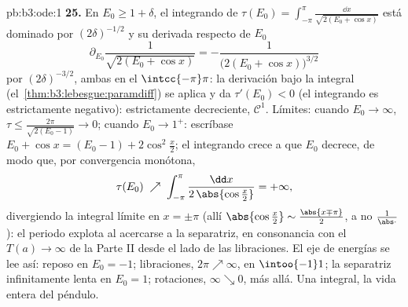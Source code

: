 \begin{solution}{pb:b3:ode:1}
\textbf{25.} En $E_0 \geq 1 + \delta$, el integrando de
$\tau(E_0) = \int_{-\pi}^{\pi}\frac{\dd x}{\sqrt{2(E_0 +
\cos x)}}$ está dominado por $(2\delta)^{-1/2}$ y su derivada respecto
de $E_0$
\[
\partial_{E_0}\frac1{\sqrt{2(E_0 + \cos x)}}
= -\frac{1}{\bigl(2(E_0 + \cos x)\bigr)^{3/2}}
\]
por $(2\delta)^{-3/2}$, ambas 
en el  $\intcc{-\pi}\pi$: la
derivación bajo la integral (el~\cref{thm:b3:lebesgue:paramdiff}) se
aplica y da $\tau'(E_0) < 0$ (el integrando es estrictamente negativo):
estrictamente decreciente, $\mathcal C^1$. Límites: cuando $E_0 \to
\infty$, $\tau \leq \frac{2\pi}{\sqrt{2(E_0 - 1)}} \to 0$; cuando
$E_0 \to 1^+$: escríbase $E_0 + \cos x = (E_0 - 1) +
2\cos^2\frac x2$; el integrando crece a  que $E_0$ decrece, de
modo que, por convergencia monótona,
\[
\tau(E_0) \;\nearrow\;
\int_{-\pi}^{\pi}\frac{\dd x}{2\,\abs{\cos\frac x2}}
= +\infty,
\]
divergiendo la integral límite en $x = \pm\pi$ (allí
$\abs{\cos\frac x2} \sim \frac{\abs{x \mp \pi}}2$, a
no  $\frac1{\abs\cdot}$): el
periodo explota al acercarse a la separatriz, en consonancia con el
$T(a) \to
\infty$ de la Parte II desde el lado de las libraciones. El eje de
energías se lee así: reposo en $E_0 = -1$; libraciones, $2\pi \nearrow
\infty$, en $\intoo{-1}1$; la separatriz infinitamente lenta en
$E_0 = 1$; rotaciones, $\infty \searrow 0$, más allá. Una integral, la
vida entera del péndulo.
\end{solution}
